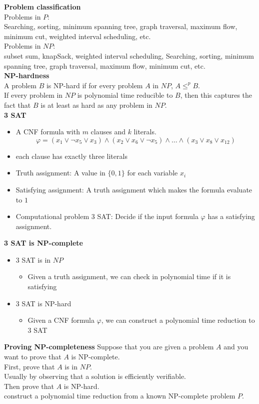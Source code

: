 \documentclass[onecolumn]{report}
\begin{document}
\textbf{Problem classification}\\
Problems in $P$:\\
\indent Searching, sorting, minimum spanning tree, graph traversal, maximum flow, minimum cut, weighted interval scheduling, etc.\\
Problems in $NP$:\\
\indent subset sum, knapSack, weighted interval scheduling, Searching, sorting, minimum spanning tree, graph traversal, maximum flow, minimum cut, etc.\\
\textbf{NP-hardness}\\
A problem $B$ is NP-hard if for every problem $A$ in $NP$, $A \leq^p B$.\\
\indent If every problem in $NP$ is polynomial time reducible to $B$, then this captures the fact that $B$ is at least as hard as any problem in $NP$.\\
\textbf{3 SAT}
\begin{itemize}
    \item A CNF formula with $m$ clauses and $k$ literals.
    \begin{equation*}
        \varphi = (x_1 \lor \lnot x_5 \lor x_3) \land ( x_2 \lor x_6 \lor \lnot x_5) \land \dots \land (x_3 \lor x_8 \lor x_{12})
    \end{equation*}
    \item each clause has exactly three literals
    \item Truth assignment: A value in $\{0, 1\}$ for each variable $x_i$
    \item Satisfying assignment: A truth assignment which makes the formula evaluate to $1$
    \item Computational problem 3 SAT: Decide if the input formula $\varphi$ has a satisfying assignment.
\end{itemize}
\textbf{3 SAT is NP-complete}
\begin{itemize}
    \item 3 SAT is in $NP$
    \begin{itemize}
        \item Given a truth assignment, we can check in polynomial time if it is satisfying
    \end{itemize}
    \item 3 SAT is NP-hard
    \begin{itemize}
        \item Given a CNF formula $\varphi$, we can construct a polynomial time reduction to 3 SAT
    \end{itemize}
\end{itemize}
\textbf{Proving NP-completeness}
\indent Suppose that you are given a problem $A$ and you want to prove that $A$ is NP-complete.\\
\indent First, prove that $A$ is in $NP$.\\
\indent \indent Usually by observing that a solution is efficiently verifiable.\\
\indent Then prove that $A$ is NP-hard.\\
\indent \indent construct a polynomial time reduction from a known NP-complete problem $P$.\\
\end{document}
